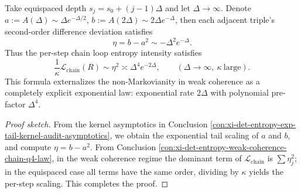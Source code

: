 \begin{conclusion}\label{con:xi-det-entropy-equispaced-loop-entropy-scaling}
Take equispaced depth \(s_j=s_0+(j-1)\Delta\) and let \(\Delta\to\infty\).
Denote
\(
a:=A(\Delta)\sim \Delta e^{-\Delta/2}
\),
\(
b:=A(2\Delta)\sim 2\Delta e^{-\Delta}
\),
then each adjacent triple's second-order difference deviation satisfies
\[
\eta=b-a^2\sim-\Delta^2e^{-\Delta}.
\]
Thus the per-step chain loop entropy intensity satisfies
\[
\frac{1}{\kappa}\mathcal L_{\mathrm{chain}}(R)
\sim \eta^2
\asymp \Delta^{4}e^{-2\Delta},
\qquad (\Delta\to\infty,\ \kappa\ \text{large}).
\]
This formula externalizes the non-Markovianity in weak coherence as a completely explicit exponential law: exponential rate \(2\Delta\) with polynomial pre-factor \(\Delta^4\).
\end{conclusion}
\begin{proof}[Proof sketch]
From the kernel asymptotics in Conclusion \ref{con:xi-det-entropy-exp-tail-kernel-audit-asymptotics}, we obtain the exponential tail scaling of \(a\) and \(b\), and compute \(\eta=b-a^2\).
From Conclusion \ref{con:xi-det-entropy-weak-coherence-chain-q4-law}, in the weak coherence regime the dominant term of \(\mathcal L_{\mathrm{chain}}\) is \(\sum \eta_j^2\); in the equispaced case all terms have the same order, dividing by \(\kappa\) yields the per-step scaling. This completes the proof.
\end{proof}

